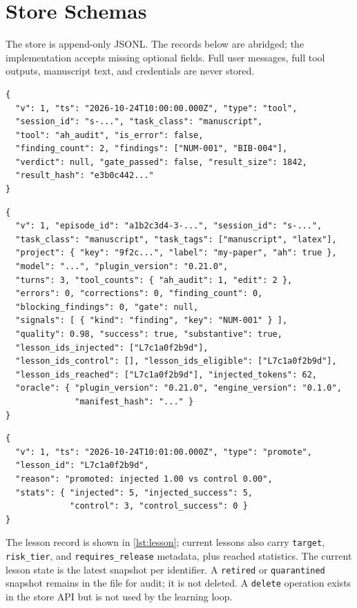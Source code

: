 \section{Store Schemas}
\label{app:schemas}

The store is append-only JSONL. The records below are abridged; the implementation accepts missing optional fields. Full user messages, full tool outputs, manuscript text, and credentials are never stored.

\begin{lstlisting}[style=json,caption={Tool event (abridged).}]
{
  "v": 1, "ts": "2026-10-24T10:00:00.000Z", "type": "tool",
  "session_id": "s-...", "task_class": "manuscript",
  "tool": "ah_audit", "is_error": false,
  "finding_count": 2, "findings": ["NUM-001", "BIB-004"],
  "verdict": null, "gate_passed": false, "result_size": 1842,
  "result_hash": "e3b0c442..."
}
\end{lstlisting}

\begin{lstlisting}[style=json,caption={Episode record (abridged).}]
{
  "v": 1, "episode_id": "a1b2c3d4-3-...", "session_id": "s-...",
  "task_class": "manuscript", "task_tags": ["manuscript", "latex"],
  "project": { "key": "9f2c...", "label": "my-paper", "ah": true },
  "model": "...", "plugin_version": "0.21.0",
  "turns": 3, "tool_counts": { "ah_audit": 1, "edit": 2 },
  "errors": 0, "corrections": 0, "finding_count": 0,
  "blocking_findings": 0, "gate": null,
  "signals": [ { "kind": "finding", "key": "NUM-001" } ],
  "quality": 0.98, "success": true, "substantive": true,
  "lesson_ids_injected": ["L7c1a0f2b9d"],
  "lesson_ids_control": [], "lesson_ids_eligible": ["L7c1a0f2b9d"],
  "lesson_ids_reached": ["L7c1a0f2b9d"], "injected_tokens": 62,
  "oracle": { "plugin_version": "0.21.0", "engine_version": "0.1.0",
              "manifest_hash": "..." }
}
\end{lstlisting}

\begin{lstlisting}[style=json,caption={Decision record (abridged).}]
{
  "v": 1, "ts": "2026-10-24T10:01:00.000Z", "type": "promote",
  "lesson_id": "L7c1a0f2b9d",
  "reason": "promoted: injected 1.00 vs control 0.00",
  "stats": { "injected": 5, "injected_success": 5,
             "control": 3, "control_success": 0 }
}
\end{lstlisting}

The lesson record is shown in \cref{lst:lesson}; current lessons also carry \texttt{target}, \texttt{risk\_tier}, and \texttt{requires\_release} metadata, plus reached statistics. The current lesson state is the latest snapshot per identifier. A \texttt{retired} or \texttt{quarantined} snapshot remains in the file for audit; it is not deleted. A \texttt{delete} operation exists in the store API but is not used by the learning loop.

